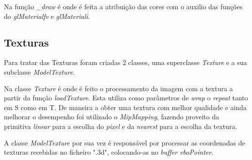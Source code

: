 \documentclass[relatorio.tex]{subfiles}
\begin{document}
Na função \textit{_draw} é onde é feita a atribuição das cores com o auxilio das funções
do \textit{glMaterialfv} e \textit{glMateriali}.

\subsection{Texturas}
Para tratar das Texturas foram criadas 2 classes, uma superclasse
\textit{Texture} e a sua subclasse \textit{ModelTexture}.

Na classe \textit{Texture} é onde é feito o processamento da imagem com a textura
a partir da função \textit{loadTexture}. Esta utiliza como parâmetros de
\textit{wrap} o \textit{repeat} tanto em S como em T. De maneira a obter
uma textura com melhor qualidade e ainda melhorar o desempenho foi utilizado
o \textit{MipMapping}, fazendo proveito da primitiva \textit{linear} para a 
escolha do \textit{pixel} e da \textit{nearest} para a escolha da textura.

A classe \textit{ModelTexture} por sua vez é responsável por processar as coordenadas de texturas
recebidas no ficheiro ".3d", colocando-as no \textit{buffer vboPointer}.
\end{document}
